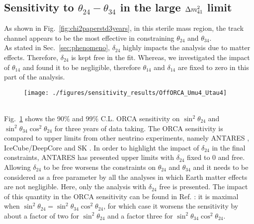 \subsection{Sensitivity to $\theta_{24} -\theta_{34}$ in the large $\Delta m^2_{41}$ limit}
As shown in Fig.\ \ref{fig:chi2paperstd3years}, in this sterile mass region, the track channel appears to be the most effective in constraining $\theta_{24}$ and $\theta_{34}$.
\\
As stated in Sec.\ \ref{sec:phenomeno}, %
$\delta_{24}$ highly impacts the analysis due to matter effects. Therefore, $\delta_{24}$ is kept free in the fit. Whereas, we  investigated the impact of $\theta_{14}$ and found it to be negligible, therefore $\theta_{14}$ and $\delta_{14}$ are fixed to zero in this part of the analysis.
\begin{figure}[h]
\centering
\texttt{[image: ./figures/sensitivity\_results/OffORCA\_Umu4\_Utau4]}
\label{fig:sen-Um-Ut}
\end{figure}
\\
Fig.\ \ref{fig:sen-Um-Ut} shows the 90$\%$ and 99$\%$ C.L. ORCA sensitivity on $\sin^2 \theta_{24}$ and $\sin^2 \theta_{34} \cos^2 \theta_{24}$ for three years of data taking. The ORCA sensitivity is compared to upper limits from other neutrino experiments, namely ANTARES \cite{ANTARES_Sterile}, IceCube/DeepCore \cite{DeepCore_Steriles} and SK \cite{SK}. In order to highlight the impact of $\delta_{24}$ in the final constraints, ANTARES has presented upper limits \cite{ANTARES_Sterile} with $\delta_{24}$ fixed to 0 and free. Allowing $\delta_{24}$ to be free worsens the constraints on $\theta_{24}$ and $\theta_{34}$ and it needs to be considered as a free parameter by all the analyses in which Earth matter effects are not negligible. Here, only the analysis with $\delta_{24}$ free is presented. The impact of this quantity in the ORCA sensitivity can be found in Ref. \cite{icrc_steriles}: it is maximal when $\sin^2 \theta_{24} = \sin^2 \theta_{34} \cos^2 \theta_{24}$, for which case it worsens the sensitivity by about a factor of two for $\sin^2 \theta_{24}$ and a factor three for $\sin^2 \theta_{34} \cos^2 \theta_{24}$. 
